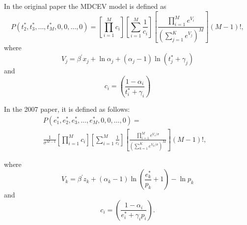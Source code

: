 \documentclass[12pt,a4paper]{article}
\begin{document}
In the original paper the MDCEV model is defined as
\begin{equation}
  P\left(t_2^*, t_3^*, \ldots, t_M^*, 0,0, \ldots, 0\right)=
  \left[\prod_{i=1}^M c_i\right]
  \left[\sum_{i=1}^M \frac{1}{c_i}\right]
  \left[\frac{\prod_{i=1}^M e^{V_i}}{\left(\sum_{j=1}^K e^{V_j}\right)^M}\right](M-1) !,
\end{equation}
where
\begin{equation}
  V_j=\beta^{\prime} x_j+\ln \alpha_j+\left(\alpha_j-1\right) \ln \left(t_j^*+\gamma_j\right)
\end{equation}
and
\begin{equation}
  c_i=\left(\frac{1-\alpha_i}{t_i^*+\gamma_i}\right)
\end{equation}

In the 2007 paper, it is defined as follows:
\begin{equation}
  \begin{aligned}
P\left(e_1^*, e_2^*, e_3^*, \ldots, e_M^*, 0,0, \ldots, 0\right) = &\\
\frac{1}{\sigma^{M-1}}
\left[\prod_{i=1}^M c_i\right]
\left[\sum_{i=1}^M \frac{1}{c_i}\right]
\left[\frac{\prod_{i=1}^M e^{V_i / \sigma}}{\left(\sum_{k=1}^K e^{V_k / \sigma}\right)^M}\right](M-1) !,
  \end{aligned}
\end{equation}

where
\begin{equation}
  V_k=\beta^{\prime} z_k+\left(\alpha_k-1\right) \ln \left(\frac{e_k^*}{p_k}+1\right)-\ln p_k
\end{equation}
and
  \begin{equation}
    c_i=\left(\frac{1-\alpha_i}{e_i^*+\gamma_i p_i}\right).
  \end{equation}
\end{document}
